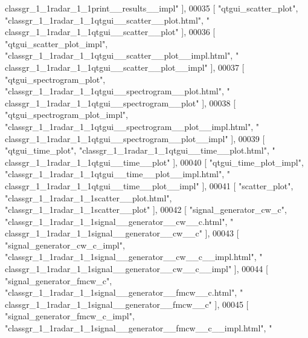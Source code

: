 \begin{DoxyCode}
{      classgr\_1\_1radar\_1\_1print\_\_results\_\_impl"} ],
00035     [ \textcolor{stringliteral}{"qtgui\_scatter\_plot"}, \textcolor{stringliteral}{"classgr\_1\_1radar\_1\_1qtgui\_\_scatter\_\_plot.html"}, \textcolor{stringliteral}{"
      classgr\_1\_1radar\_1\_1qtgui\_\_scatter\_\_plot"} ],
00036     [ \textcolor{stringliteral}{"qtgui\_scatter\_plot\_impl"}, \textcolor{stringliteral}{"classgr\_1\_1radar\_1\_1qtgui\_\_scatter\_\_plot\_\_impl.html"}, \textcolor{stringliteral}{"
      classgr\_1\_1radar\_1\_1qtgui\_\_scatter\_\_plot\_\_impl"} ],
00037     [ \textcolor{stringliteral}{"qtgui\_spectrogram\_plot"}, \textcolor{stringliteral}{"classgr\_1\_1radar\_1\_1qtgui\_\_spectrogram\_\_plot.html"}, \textcolor{stringliteral}{"
      classgr\_1\_1radar\_1\_1qtgui\_\_spectrogram\_\_plot"} ],
00038     [ \textcolor{stringliteral}{"qtgui\_spectrogram\_plot\_impl"}, \textcolor{stringliteral}{"classgr\_1\_1radar\_1\_1qtgui\_\_spectrogram\_\_plot\_\_impl.html"}, \textcolor{stringliteral}{"
      classgr\_1\_1radar\_1\_1qtgui\_\_spectrogram\_\_plot\_\_impl"} ],
00039     [ \textcolor{stringliteral}{"qtgui\_time\_plot"}, \textcolor{stringliteral}{"classgr\_1\_1radar\_1\_1qtgui\_\_time\_\_plot.html"}, \textcolor{stringliteral}{"
      classgr\_1\_1radar\_1\_1qtgui\_\_time\_\_plot"} ],
00040     [ \textcolor{stringliteral}{"qtgui\_time\_plot\_impl"}, \textcolor{stringliteral}{"classgr\_1\_1radar\_1\_1qtgui\_\_time\_\_plot\_\_impl.html"}, \textcolor{stringliteral}{"
      classgr\_1\_1radar\_1\_1qtgui\_\_time\_\_plot\_\_impl"} ],
00041     [ \textcolor{stringliteral}{"scatter\_plot"}, \textcolor{stringliteral}{"classgr\_1\_1radar\_1\_1scatter\_\_plot.html"}, \textcolor{stringliteral}{"classgr\_1\_1radar\_1\_1scatter\_\_plot"} ],
00042     [ \textcolor{stringliteral}{"signal\_generator\_cw\_c"}, \textcolor{stringliteral}{"classgr\_1\_1radar\_1\_1signal\_\_generator\_\_cw\_\_c.html"}, \textcolor{stringliteral}{"
      classgr\_1\_1radar\_1\_1signal\_\_generator\_\_cw\_\_c"} ],
00043     [ \textcolor{stringliteral}{"signal\_generator\_cw\_c\_impl"}, \textcolor{stringliteral}{"classgr\_1\_1radar\_1\_1signal\_\_generator\_\_cw\_\_c\_\_impl.html"}, \textcolor{stringliteral}{"
      classgr\_1\_1radar\_1\_1signal\_\_generator\_\_cw\_\_c\_\_impl"} ],
00044     [ \textcolor{stringliteral}{"signal\_generator\_fmcw\_c"}, \textcolor{stringliteral}{"classgr\_1\_1radar\_1\_1signal\_\_generator\_\_fmcw\_\_c.html"}, \textcolor{stringliteral}{"
      classgr\_1\_1radar\_1\_1signal\_\_generator\_\_fmcw\_\_c"} ],
00045     [ \textcolor{stringliteral}{"signal\_generator\_fmcw\_c\_impl"}, \textcolor{stringliteral}{"classgr\_1\_1radar\_1\_1signal\_\_generator\_\_fmcw\_\_c\_\_impl.html"}, \textcolor{stringliteral}{"
}
\end{DoxyCode}
